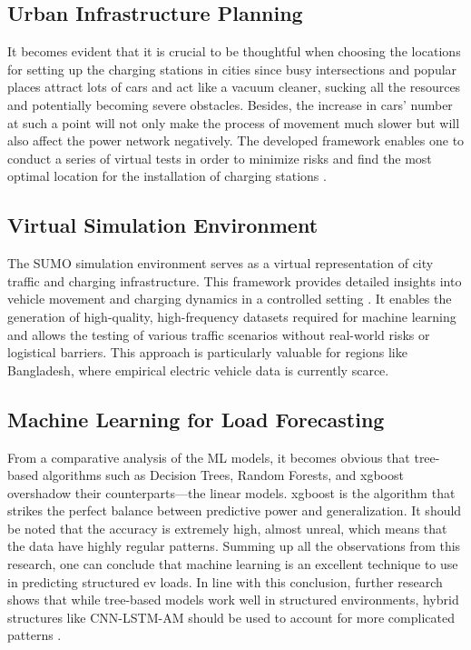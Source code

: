 \documentclass{thesis-library}
\begin{document}
{\subsection{Urban Infrastructure Planning}

It becomes evident that it is crucial to be thoughtful when choosing the locations for setting up the charging stations in cities since busy intersections and popular places attract lots of cars and act like a vacuum cleaner, sucking all the resources and potentially becoming severe obstacles. Besides, the increase in cars’ number at such a point will not only make the process of movement much slower but will also affect the power network negatively. The developed framework enables one to conduct a series of virtual tests in order to minimize risks and find the most optimal location for the installation of charging stations \cite{charging_station_placement2021}.

\subsection{Virtual Simulation Environment}

The SUMO simulation environment serves as a virtual representation of city traffic and charging infrastructure. This framework provides detailed insights into vehicle movement and charging dynamics in a controlled setting \cite{ev_simulation2020}. It enables the generation of high-quality, high-frequency datasets required for machine learning and allows the testing of various traffic scenarios without real-world risks or logistical barriers. This approach is particularly valuable for regions like Bangladesh, where empirical electric vehicle data is currently scarce.

\subsection{Machine Learning for Load Forecasting}

From a comparative analysis of the ML models, it becomes obvious that tree-based algorithms such as Decision Trees, Random Forests, and \Gls{xgboost} overshadow their counterparts—the linear models. \Gls{xgboost} is the algorithm that strikes the perfect balance between predictive power and generalization. It should be noted that the accuracy is extremely high, almost unreal, which means that the data have highly regular patterns. Summing up all the observations from this research, one can conclude that machine learning is an excellent technique to use in predicting structured \Gls{ev} loads. In line with this conclusion, further research shows that while tree-based models work well in structured environments, hybrid structures like CNN-LSTM-AM should be used to account for more complicated patterns \cite{ran2025ev, kyriakopoulos_experimental_2026}.

}
\end{document}
